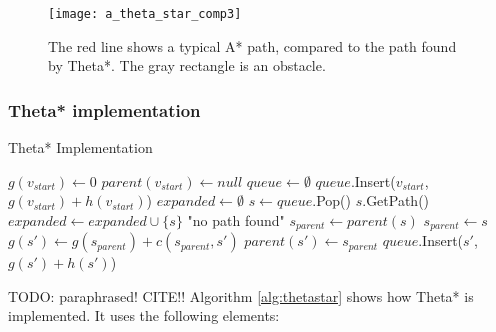\begin{figure}
\texttt{[image: a\_theta\_star\_comp3]}
\caption{The red line shows a typical A* path, compared to the path found by Theta*. The gray rectangle is an obstacle.}
\label{figure:thetastarcompare}
\end{figure}


\subsubsection{Theta* implementation}
\begin{algorithm}
\caption{Theta* Implementation}
\label{alg:thetastar}
\begin{algorithmic}[1]
	\State $g(v_{start}) \leftarrow 0$
	\State $parent(v_{start}) \leftarrow null$
	\State $queue \leftarrow \emptyset$
	\State $queue$.Insert($v_{start}$, $g(v_{start}) + h(v_{start})$)
	\State $expanded \leftarrow \emptyset$
		\State $s \leftarrow queue$.Pop()
			\Return $s$.GetPath()
		\EndIf
		\State $expanded \leftarrow expanded \cup \{s\}$
			\EndIf
		\EndFor
	\EndWhile
	\Return "no path found"
\EndFunction
{}
		\State $s_{parent} \leftarrow parent(s)$
	\Else
		\State $s_{parent} \leftarrow s$	
	\EndIf
		\State $g(s') \leftarrow g(s_{parent}) + c(s_{parent},s')$
		\State $parent(s') \leftarrow s_{parent}$
		\State $queue$.Insert($s'$,$g(s') + h(s')$)
	\EndIf
\EndFunction{}
\end{algorithmic}
\end{algorithm}
TODO: paraphrased! CITE!!
Algorithm \ref{alg:thetastar} shows how Theta* is implemented. It uses the following elements:
